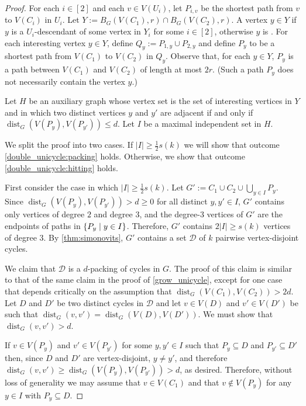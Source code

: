 \documentclass{patmorin}
\DeclareMathOperator{\dist}{dist}
\DeclarePairedDelimiter\set{\{}{\}}
\begin{document}
\begin{proof}
    For each $i\in[2]$ and each $v\in V(U_i)$, let $P_{i,v}$ be the shortest path from $v$ to $V(C_i)$ in $U_i$.     Let $Y:=B_G(V(C_1),r)\cap B_G(V(C_2),r)$. A vertex $y\in Y$  if $y$ is a $U_i$-descendant of some vertex in $Y_i$ for some $i\in[2]$,  otherwise $y$ is .  For each interesting vertex $y\in Y$, define $Q_y:= P_{1,y}\cup P_{2,y}$ and define $P_y$ to be a shortest path from $V(C_1)$ to $V(C_2)$ in $Q_y$.  Observe that, for each $y\in Y$, $P_y$ is a path between $V(C_1)$ and $V(C_2)$ of length at most $2r$.  (Such a path $P_y$ does not necessarily contain the vertex $y$.) 

    Let $H$ be an auxiliary graph whose vertex set is the set of interesting vertices in $Y$ and in which two distinct vertices $y$ and $y'$ are adjacent if and only if $\dist_G(V(P_y),V(P_{y'}))\leq d$.
    Let $I$ be a maximal independent set in $H$.

    We split the proof into two cases.  If 
    $|I|\geq \frac{1}{2}s(k)$ we will show that outcome \cref{double_unicycle:packing} holds.  Otherwise, we show that outcome \cref{double_unicycle:hitting} holds.

    First consider the case in which $|I|\ge\tfrac{1}{2}s(k)$.
    Let $G':=C_1\cup C_2\cup\bigcup_{y\in I}P_y$.
    Since $\dist_G(V(P_y),V(P_{y'}))>d\ge 0$ for all distinct $y,y'\in I$, $G'$ contains only vertices of degree $2$ and degree $3$, and the degree-$3$ vertices of $G'$ are the endpoints of paths in $\set{P_y\mid y\in I}$.
    Therefore, $G'$ contains $2|I|\geq s(k)$ vertices of degree $3$.
    By \cref{thm:simonovits}, $G'$ contains a set $\mathcal{D}$ of $k$ pairwise vertex-disjoint cycles.

    We claim that $\mathcal{D}$ is a $d$-packing of cycles in $G$. The proof of this claim is similar to that of the same claim in the proof of \cref{grow_unicycle}, except for one case that depends critically on the assumption that $\dist_G(V(C_1),V(C_2))>2d$.  Let $D$ and $D'$ be two distinct cycles in $\mathcal{D}$ and let $v\in V(D)$ and $v'\in V(D')$ be such that $\dist_G(v,v')=\dist_G(V(D),V(D'))$.  We must show that $\dist_G(v,v')>d$.


    If $v\in V(P_y)$ and $v'\in V(P_{y'})$ for some  $y,y' \in I$ such that $P_y\subseteq D$ and $P_{y'}\subseteq D'$ then, 
    since $D$ and $D'$ are vertex-disjoint, $y\neq y'$, and therefore 
    $\dist_G(v,v')\geq  \dist_G(V(P_y),V(P_{y'}))>d$, as desired.  Therefore, without loss of generality we may assume that $v\in V(C_1)$ and that $v\notin V(P_y)$ for any $y\in I$ with $P_y\subseteq D$.


\end{proof}
\end{document}
